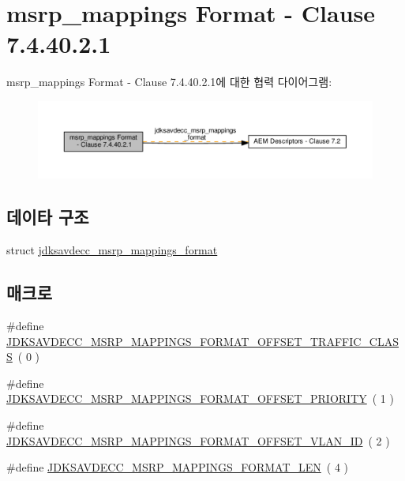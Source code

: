 \hypertarget{group__msrp__mappings__format}{}\section{msrp\+\_\+mappings Format -\/ Clause 7.4.40.2.1}
\label{group__msrp__mappings__format}
msrp\+\_\+mappings Format -\/ Clause 7.4.40.2.1에 대한 협력 다이어그램\+:
\nopagebreak
\begin{figure}[H]
\begin{center}
\leavevmode
\includegraphics[width=350pt]{group__msrp__mappings__format}
\end{center}
\end{figure}
\subsection*{데이타 구조}
\begin{DoxyCompactItemize}
\item 
struct \hyperlink{structjdksavdecc__msrp__mappings__format}{jdksavdecc\+\_\+msrp\+\_\+mappings\+\_\+format}
\end{DoxyCompactItemize}
\subsection*{매크로}
\begin{DoxyCompactItemize}
\item 
\#define \hyperlink{group__msrp__mappings__format_gafb4f40fafbc97e1cbc3d37494fd7ccd9}{J\+D\+K\+S\+A\+V\+D\+E\+C\+C\+\_\+\+M\+S\+R\+P\+\_\+\+M\+A\+P\+P\+I\+N\+G\+S\+\_\+\+F\+O\+R\+M\+A\+T\+\_\+\+O\+F\+F\+S\+E\+T\+\_\+\+T\+R\+A\+F\+F\+I\+C\+\_\+\+C\+L\+A\+SS}~( 0 )
\item 
\#define \hyperlink{group__msrp__mappings__format_ga43ca4bc33c03adb61790e361d1cd625c}{J\+D\+K\+S\+A\+V\+D\+E\+C\+C\+\_\+\+M\+S\+R\+P\+\_\+\+M\+A\+P\+P\+I\+N\+G\+S\+\_\+\+F\+O\+R\+M\+A\+T\+\_\+\+O\+F\+F\+S\+E\+T\+\_\+\+P\+R\+I\+O\+R\+I\+TY}~( 1 )
\item 
\#define \hyperlink{group__msrp__mappings__format_gac89827632a3bb8e747f9c1d7b1be3faa}{J\+D\+K\+S\+A\+V\+D\+E\+C\+C\+\_\+\+M\+S\+R\+P\+\_\+\+M\+A\+P\+P\+I\+N\+G\+S\+\_\+\+F\+O\+R\+M\+A\+T\+\_\+\+O\+F\+F\+S\+E\+T\+\_\+\+V\+L\+A\+N\+\_\+\+ID}~( 2 )
\item 
\#define \hyperlink{group__msrp__mappings__format_ga4ec95c1f1d0677ac9a1f6edae29fad0c}{J\+D\+K\+S\+A\+V\+D\+E\+C\+C\+\_\+\+M\+S\+R\+P\+\_\+\+M\+A\+P\+P\+I\+N\+G\+S\+\_\+\+F\+O\+R\+M\+A\+T\+\_\+\+L\+EN}~( 4 )
\end{DoxyCompactItemize}
